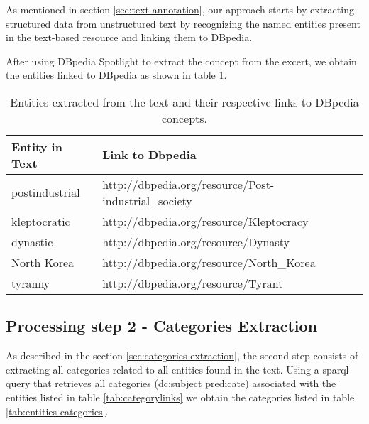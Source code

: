 As mentioned in section \ref{sec:text-annotation}, our approach starts by extracting structured data from unstructured text by recognizing the named entities present in the text-based resource and linking them to DBpedia. 

After using DBpedia Spotlight to extract the concept from the excert, we obtain the entities linked to DBpedia as shown in table \ref{tab:example-entities}.

\begin{table}[H]
\centering
\caption{Entities extracted from the text and their respective links to DBpedia concepts.}
\label{tab:example-entities}
\begin{tabular}{@{}ll@{}}
\toprule
Entity in Text & Link to Dbpedia                                  \\ \midrule
postindustrial & http://dbpedia.org/resource/Post-industrial\_society \\
kleptocratic   & http://dbpedia.org/resource/Kleptocracy              \\
dynastic       & http://dbpedia.org/resource/Dynasty                  \\
North Korea    & http://dbpedia.org/resource/North\_Korea             \\
tyranny        & http://dbpedia.org/resource/Tyrant                   \\ \bottomrule
\end{tabular}
\end{table}


\subsection{\hspace*{3pt} Processing step 2 - Categories Extraction}

As described in the section \ref {sec:categories-extraction}, the second step consists of extracting all categories related to all entities found in the text.
Using a \gls{sparql} query that retrieves all categories (dc:subject predicate) associated with the entities listed in table \ref{tab:categorylinks} we obtain the categories listed in table \ref{tab:entities-categories}.


